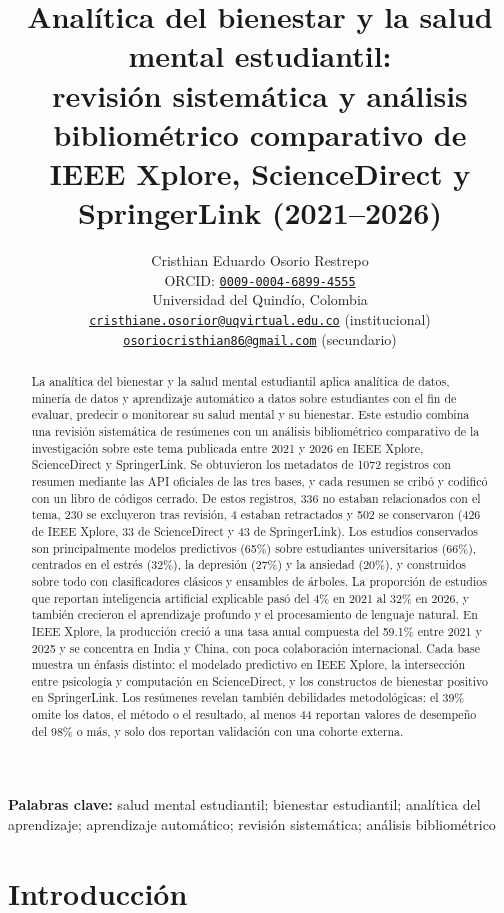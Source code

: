 \documentclass[11pt,a4paper]{article}
\title{Analítica del bienestar y la salud mental estudiantil:\\
revisión sistemática y análisis bibliométrico comparativo de\\
IEEE Xplore, ScienceDirect y SpringerLink (2021--2026)}
\author{Cristhian Eduardo Osorio Restrepo\\[2pt]
\small ORCID: \href{https://orcid.org/0009-0004-6899-4555}{\texttt{0009-0004-6899-4555}}\\
\small Universidad del Quindío, Colombia\\
\small \href{mailto:cristhiane.osorior@uqvirtual.edu.co}{\texttt{cristhiane.osorior@uqvirtual.edu.co}} (institucional)\\
\small \href{mailto:osoriocristhian86@gmail.com}{\texttt{osoriocristhian86@gmail.com}} (secundario)}
\date{}
\begin{document}
\maketitle

\begin{abstract}
La analítica del bienestar y la salud mental estudiantil aplica analítica de datos, minería de datos y aprendizaje automático a datos sobre estudiantes con el fin de evaluar, predecir o monitorear su salud mental y su bienestar. Este estudio combina una revisión sistemática de resúmenes con un análisis bibliométrico comparativo de la investigación sobre este tema publicada entre 2021 y 2026 en IEEE Xplore, ScienceDirect y SpringerLink. Se obtuvieron los metadatos de 1072 registros con resumen mediante las API oficiales de las tres bases, y cada resumen se cribó y codificó con un libro de códigos cerrado. De estos registros, 336 no estaban relacionados con el tema, 230 se excluyeron tras revisión, 4 estaban retractados y 502 se conservaron (426 de IEEE Xplore, 33 de ScienceDirect y 43 de SpringerLink). Los estudios conservados son principalmente modelos predictivos (65\%) sobre estudiantes universitarios (66\%), centrados en el estrés (32\%), la depresión (27\%) y la ansiedad (20\%), y construidos sobre todo con clasificadores clásicos y ensambles de árboles. La proporción de estudios que reportan inteligencia artificial explicable pasó del 4\% en 2021 al 32\% en 2026, y también crecieron el aprendizaje profundo y el procesamiento de lenguaje natural. En IEEE Xplore, la producción creció a una tasa anual compuesta del 59.1\% entre 2021 y 2025 y se concentra en India y China, con poca colaboración internacional. Cada base muestra un énfasis distinto: el modelado predictivo en IEEE Xplore, la intersección entre psicología y computación en ScienceDirect, y los constructos de bienestar positivo en SpringerLink. Los resúmenes revelan también debilidades metodológicas: el 39\% omite los datos, el método o el resultado, al menos 44 reportan valores de desempeño del 98\% o más, y solo dos reportan validación con una cohorte externa.
\end{abstract}

\noindent\textbf{Palabras clave:} salud mental estudiantil; bienestar estudiantil; analítica del aprendizaje; aprendizaje automático; revisión sistemática; análisis bibliométrico

\section{Introducción}
\end{document}
